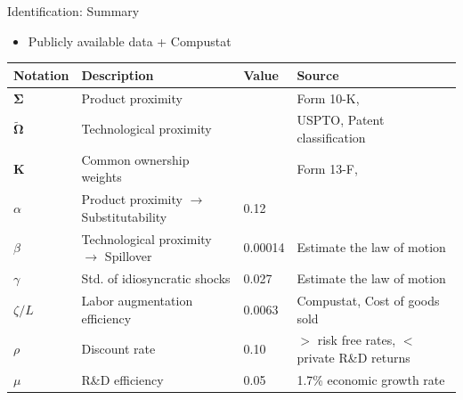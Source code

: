 \documentclass[
  10pt,
  aspectratio=169,   %
  handout           %
]{beamer}
\theoremstyle{plain}
\begin{document}
\begin{frame}{Identification: Summary}
  \begin{itemize}
    \item Publicly available data + Compustat
  \end{itemize}
  \begin{table}[h]
    \centering
    \small %
    \begin{tabular}{llll}
      \toprule
      Notation                           & Description                                      & Value   & Source                                   \\
      \midrule
      $\bm{\Sigma}$                   & Product proximity                                &         & Form 10-K, \citet{Hoberg2016-jm}          \\
      $\bm{\widetilde{\Omega}}$       & Technological proximity                          &         & USPTO, Patent classification             \\
      $\bm{K}$                        & Common ownership weights                         &         & Form 13-F, \citet{Backus2021-yt}          \\
      $\alpha$                           & Product proximity $\rightarrow$ Substitutability & 0.12    & \citet{Pellegrino2024-dn}                \\
      $\beta$                            & Technological proximity $\rightarrow$ Spillover  & 0.00014 & Estimate the law of motion               \\
      $\gamma$                           & Std. of idiosyncratic shocks                    & 0.027   & Estimate the law of motion               \\
      $\zeta/L$                          & Labor augmentation efficiency                    & 0.0063  & Compustat, Cost of goods sold            \\
      $\rho$                             & Discount rate                                    & 0.10    & $>$ risk free rates, $<$ private R\&D returns \\
      $\mu$                              & R\&D efficiency                                  & 0.05    & 1.7\% economic growth rate               \\
      \bottomrule
    \end{tabular}
  \end{table}
\end{frame}
\end{document}

